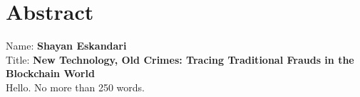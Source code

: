 
\chapter*{Abstract}

Name: 	\tab \textbf{Shayan Eskandari} \\
Title: 	\tab \textbf{New Technology, Old Crimes: Tracing Traditional Frauds in the Blockchain World}\\


Hello. No more than 250 words.





